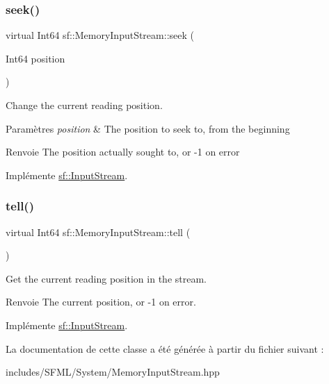 \subsubsection{\texorpdfstring{seek()}{seek()}}
{\footnotesize\ttfamily virtual Int64 sf\+::\+Memory\+Input\+Stream\+::seek (\begin{DoxyParamCaption}\item[{Int64}]{position }\end{DoxyParamCaption})\hspace{0.3cm}{\ttfamily [virtual]}}



Change the current reading position. 


\begin{DoxyParams}{Paramètres}
{\em position} & The position to seek to, from the beginning\\
\hline
\end{DoxyParams}
\begin{DoxyReturn}{Renvoie}
The position actually sought to, or -\/1 on error 
\end{DoxyReturn}


Implémente \hyperlink{classsf_1_1InputStream_a76aba8e5d5cf9b1c5902d5e04f7864fc}{sf\+::\+Input\+Stream}.

\mbox{\label{classsf_1_1MemoryInputStream_a7ad4bdf721f29de8f66421ff29e23ee4}} 
\subsubsection{\texorpdfstring{tell()}{tell()}}
{\footnotesize\ttfamily virtual Int64 sf\+::\+Memory\+Input\+Stream\+::tell (\begin{DoxyParamCaption}{ }\end{DoxyParamCaption})\hspace{0.3cm}{\ttfamily [virtual]}}



Get the current reading position in the stream. 

\begin{DoxyReturn}{Renvoie}
The current position, or -\/1 on error. 
\end{DoxyReturn}


Implémente \hyperlink{classsf_1_1InputStream_a599515b9ccdbddb6fef5a98424fd559c}{sf\+::\+Input\+Stream}.



La documentation de cette classe a été générée à partir du fichier suivant \+:\begin{DoxyCompactItemize}
\item 
includes/\+S\+F\+M\+L/\+System/Memory\+Input\+Stream.\+hpp\end{DoxyCompactItemize}
